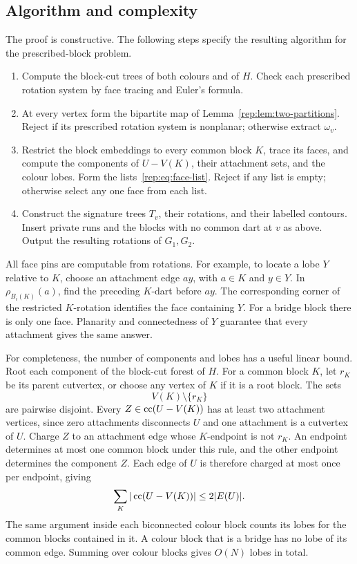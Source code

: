 \subsection{Algorithm and complexity}
\label{rep:algorithm}

The proof is constructive.  The following steps specify the resulting
algorithm for the prescribed-block problem.
\begin{enumerate}
\item Compute the block-cut trees of both colours and of $H$.  Check each
prescribed rotation system by face tracing and Euler's formula.
\item At every vertex form the bipartite map of
Lemma~\ref{rep:lem:two-partitions}.  Reject if its prescribed rotation system
is nonplanar; otherwise extract $\omega_v$.
\item Restrict the block embeddings to every common block $K$, trace its
faces, and compute the components of $U-V(K)$, their attachment sets, and
the colour lobes.  Form the lists~\eqref{rep:eq:face-list}.  Reject if any
list is empty; otherwise select any one face from each list.
\item Construct the signature trees $T_v$, their rotations, and their
labelled contours.  Insert private runs and the blocks with no common
dart at $v$ as above.  Output the resulting rotations of $G_1,G_2$.
\end{enumerate}

All face pins are computable from rotations.  For example, to locate a
lobe $Y$ relative to $K$, choose an attachment edge $ay$, with $a\in K$
and $y\in Y$.  In $\rho_{B_i(K)}(a)$, find the preceding $K$-dart before
$ay$.  The corresponding corner of the restricted $K$-rotation identifies
the face containing $Y$.  For a bridge block there is only one face.
Planarity and connectedness of $Y$ guarantee that every attachment gives
the same answer.

For completeness, the number of components and lobes has a useful linear
bound.  Root each component of the block-cut forest of $H$.  For a common
block $K$, let $r_K$ be its parent cutvertex, or choose any vertex of $K$
if it is a root block.  The sets
\[
 V(K)\setminus\{r_K\}
\]
are pairwise disjoint.  Every $Z\in\operatorname{cc}(U-V(K))$ has at least two
attachment vertices, since zero attachments disconnects $U$ and one
attachment is a cutvertex of $U$.  Charge $Z$ to an attachment edge whose
$K$-endpoint is not $r_K$.  An endpoint determines at most one common
block under this rule, and the other endpoint determines the component
$Z$.  Each edge of $U$ is therefore charged at most once per endpoint,
giving
\[
 \sum_K |\operatorname{cc}(U-V(K))|\le 2|E(U)|.
\]
The same argument inside each biconnected colour block counts its lobes
for the common blocks contained in it.  A colour block that is a bridge
has no lobe of its common edge.  Summing over colour blocks gives $O(N)$
lobes in total.

